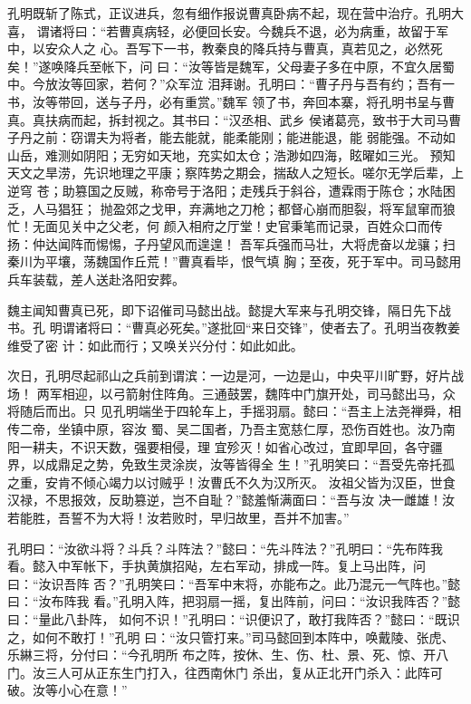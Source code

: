 孔明既斩了陈式，正议进兵，忽有细作报说曹真卧病不起，现在营中治疗。孔明大喜，
谓诸将曰：“若曹真病轻，必便回长安。今魏兵不退，必为病重，故留于军中，以安众人之
心。吾写下一书，教秦良的降兵持与曹真，真若见之，必然死矣！”遂唤降兵至帐下，问
曰：“汝等皆是魏军，父母妻子多在中原，不宜久居蜀中。今放汝等回家，若何？”众军泣
泪拜谢。孔明曰：“曹子丹与吾有约；吾有一书，汝等带回，送与子丹，必有重赏。”魏军
领了书，奔回本寨，将孔明书呈与曹真。真扶病而起，拆封视之。其书曰：“汉丞相、武乡
侯诸葛亮，致书于大司马曹子丹之前：窃谓夫为将者，能去能就，能柔能刚；能进能退，能
弱能强。不动如山岳，难测如阴阳；无穷如天地，充实如太仓；浩渺如四海，眩曜如三光。
预知天文之旱涝，先识地理之平康；察阵势之期会，揣敌人之短长。嗟尔无学后辈，上逆穹
苍；助篡国之反贼，称帝号于洛阳；走残兵于斜谷，遭霖雨于陈仓；水陆困乏，人马猖狂；
抛盈郊之戈甲，弃满地之刀枪；都督心崩而胆裂，将军鼠窜而狼忙！无面见关中之父老，何
颜入相府之厅堂！史官秉笔而记录，百姓众口而传扬：仲达闻阵而惕惕，子丹望风而遑遑！
吾军兵强而马壮，大将虎奋以龙骧；扫秦川为平壤，荡魏国作丘荒！”曹真看毕，恨气填
胸；至夜，死于军中。司马懿用兵车装载，差人送赴洛阳安葬。

魏主闻知曹真已死，即下诏催司马懿出战。懿提大军来与孔明交锋，隔日先下战书。孔
明谓诸将曰：“曹真必死矣。”遂批回“来日交锋”，使者去了。孔明当夜教姜维受了密
计：如此而行；又唤关兴分付：如此如此。

次日，孔明尽起祁山之兵前到谓滨：一边是河，一边是山，中央平川旷野，好片战场！
两军相迎，以弓箭射住阵角。三通鼓罢，魏阵中门旗开处，司马懿出马，众将随后而出。只
见孔明端坐于四轮车上，手摇羽扇。懿曰：“吾主上法尧禅舜，相传二帝，坐镇中原，容汝
蜀、吴二国者，乃吾主宽慈仁厚，恐伤百姓也。汝乃南阳一耕夫，不识天数，强要相侵，理
宜殄灭！如省心改过，宜即早回，各守疆界，以成鼎足之势，免致生灵涂炭，汝等皆得全
生！”孔明笑曰：“吾受先帝托孤之重，安肯不倾心竭力以讨贼乎！汝曹氏不久为汉所灭。
汝祖父皆为汉臣，世食汉禄，不思报效，反助篡逆，岂不自耻？”懿羞惭满面曰：“吾与汝
决一雌雄！汝若能胜，吾誓不为大将！汝若败时，早归故里，吾并不加害。”

孔明曰：“汝欲斗将？斗兵？斗阵法？”懿曰：“先斗阵法？”孔明曰：“先布阵我
看。懿入中军帐下，手执黄旗招飐，左右军动，排成一阵。复上马出阵，问曰：“汝识吾阵
否？”孔明笑曰：“吾军中末将，亦能布之。此乃混元一气阵也。”懿曰：“汝布阵我
看。”孔明入阵，把羽扇一摇，复出阵前，问曰：“汝识我阵否？”懿曰：“量此八卦阵，
如何不识！”孔明曰：“识便识了，敢打我阵否？”懿曰：“既识之，如何不敢打！”孔明
曰：“汝只管打来。”司马懿回到本阵中，唤戴陵、张虎、乐綝三将，分付曰：“今孔明所
布之阵，按休、生、伤、杜、景、死、惊、开八门。汝三人可从正东生门打入，往西南休门
杀出，复从正北开门杀入：此阵可破。汝等小心在意！”

